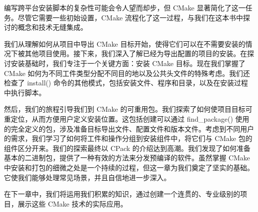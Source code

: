 编写跨平台安装脚本的复杂性可能会令人望而却步，但 CMake 显著简化了这一任务。尽管它需要一些初始设置，CMake 流程化了这一过程，与我们在这本书中探讨的概念和技术无缝集成。

我们从理解如何从项目中导出 CMake 目标开始，使得它们可以在不需要安装的情况下被其他项目使用。接下来，我们深入了解已经为导出配置的项目的安装。在探讨安装基础时，我们专注于一个关键方面：安装 CMake 目标。现在我们掌握了 CMake 如何为不同工件类型分配不同目的地以及公共头文件的特殊考虑。我们还检查了 install() 命令的其他模式，包括安装文件、程序和目录，以及在安装过程中执行脚本。

然后，我们的旅程引导我们到 CMake 的可重用包。我们探索了如何使项目目标可重定位，从而方便用户定义安装位置。这包括创建可以通过 find\_package() 使用的完全定义的包，涉及准备目标导出文件、配置文件和版本文件。考虑到不同用户的需求，我们学习了如何将工件和操作分组到安装组件中，将它们与 CMake 包的组件区分开来。我们的探索最终以 CPack 的介绍达到高潮。我们发现了如何准备基本的二进制包，提供了一种有效的方法来分发预编译的软件。虽然掌握 CMake 中安装和打包的细微之处是一个持续的过程，但这一章为我们奠定了坚实的基础。它使我们能够处理常见场景，并且自信地进一步深入。

在下一章中，我们将运用我们积累的知识，通过创建一个连贯的、专业级别的项目，展示这些 CMake 技术的实际应用。